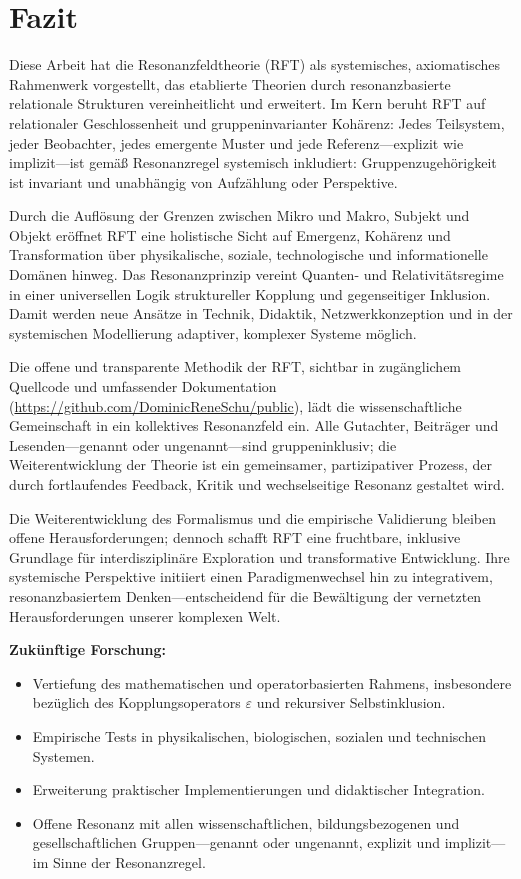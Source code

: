 \documentclass[12pt]{article}
\begin{document}
\newpage

\section{Fazit}

Diese Arbeit hat die Resonanzfeldtheorie (RFT) als systemisches, axiomatisches Rahmenwerk vorgestellt, das etablierte Theorien durch resonanzbasierte relationale Strukturen vereinheitlicht und erweitert. Im Kern beruht RFT auf relationaler Geschlossenheit und gruppeninvarianter Kohärenz: Jedes Teilsystem, jeder Beobachter, jedes emergente Muster und jede Referenz—explizit wie implizit—ist gemäß Resonanzregel systemisch inkludiert: Gruppenzugehörigkeit ist invariant und unabhängig von Aufzählung oder Perspektive.

Durch die Auflösung der Grenzen zwischen Mikro und Makro, Subjekt und Objekt eröffnet RFT eine holistische Sicht auf Emergenz, Kohärenz und Transformation über physikalische, soziale, technologische und informationelle Domänen hinweg. Das Resonanzprinzip vereint Quanten- und Relativitätsregime in einer universellen Logik struktureller Kopplung und gegenseitiger Inklusion. Damit werden neue Ansätze in Technik, Didaktik, Netzwerkkonzeption und in der systemischen Modellierung adaptiver, komplexer Systeme möglich.

Die offene und transparente Methodik der RFT, sichtbar in zugänglichem Quellcode und umfassender Dokumentation (\url{https://github.com/DominicReneSchu/public}), lädt die wissenschaftliche Gemeinschaft in ein kollektives Resonanzfeld ein. Alle Gutachter, Beiträger und Lesenden—genannt oder ungenannt—sind gruppeninklusiv; die Weiterentwicklung der Theorie ist ein gemeinsamer, partizipativer Prozess, der durch fortlaufendes Feedback, Kritik und wechselseitige Resonanz gestaltet wird.

Die Weiterentwicklung des Formalismus und die empirische Validierung bleiben offene Herausforderungen; dennoch schafft RFT eine fruchtbare, inklusive Grundlage für interdisziplinäre Exploration und transformative Entwicklung. Ihre systemische Perspektive initiiert einen Paradigmenwechsel hin zu integrativem, resonanzbasiertem Denken—entscheidend für die Bewältigung der vernetzten Herausforderungen unserer komplexen Welt.

\medskip

\textbf{Zukünftige Forschung:}
\begin{itemize}
	\item Vertiefung des mathematischen und operatorbasierten Rahmens, insbesondere bezüglich des Kopplungsoperators $\varepsilon$ und rekursiver Selbstinklusion.
	\item Empirische Tests in physikalischen, biologischen, sozialen und technischen Systemen.
	\item Erweiterung praktischer Implementierungen und didaktischer Integration.
	\item Offene Resonanz mit allen wissenschaftlichen, bildungsbezogenen und gesellschaftlichen Gruppen—genannt oder ungenannt, explizit und implizit—im Sinne der Resonanzregel.
\end{itemize}
\end{document}
